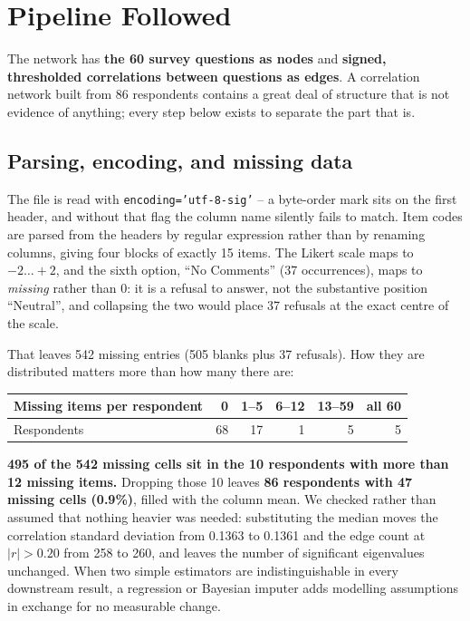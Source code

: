 
\section{Pipeline Followed}

The network has \textbf{the 60 survey questions as nodes} and \textbf{signed, thresholded
correlations between questions as edges}. A correlation network built from 86 respondents
contains a great deal of structure that is not evidence of anything; every step below
exists to separate the part that is.

\subsection{Parsing, encoding, and missing data}

The file is read with \texttt{encoding='utf-8-sig'} -- a byte-order mark sits on the first
header, and without that flag the column name silently fails to match. Item codes are
parsed from the headers by regular expression rather than by renaming columns, giving four
blocks of exactly 15 items. The Likert scale maps to $-2 \ldots +2$, and the sixth option,
``No Comments'' (37 occurrences), maps to \emph{missing} rather than $0$: it is a refusal
to answer, not the substantive position ``Neutral'', and collapsing the two would place 37
refusals at the exact centre of the scale.

That leaves 542 missing entries (505 blanks plus 37 refusals). How they are distributed
matters more than how many there are:

\begin{center}
\begin{tabular}{lrrrrr}
\toprule
Missing items per respondent & 0 & 1--5 & 6--12 & 13--59 & all 60 \\
\midrule
Respondents & 68 & 17 & 1 & 5 & 5 \\
\bottomrule
\end{tabular}
\end{center}

\noindent
\textbf{495 of the 542 missing cells sit in the 10 respondents with more than 12 missing
items.} Dropping those 10 leaves \textbf{86 respondents with 47 missing cells (0.9\%)},
filled with the column mean. We checked rather than assumed that nothing heavier was
needed: substituting the median moves the correlation standard deviation from 0.1363 to
0.1361 and the edge count at $|r|>0.20$ from 258 to 260, and leaves the number of
significant eigenvalues unchanged. When two simple estimators are indistinguishable in
every downstream result, a regression or Bayesian imputer adds modelling assumptions in
exchange for no measurable change.

